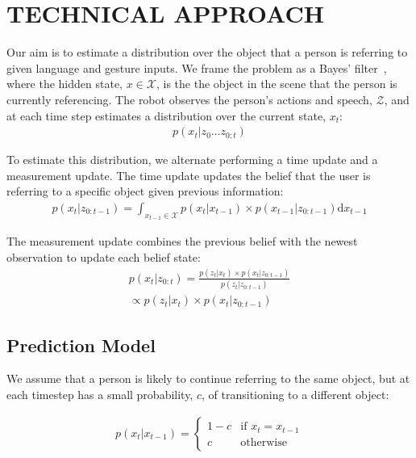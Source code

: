 \documentclass[letterpaper, 10 pt, conference]{ieeeconf}
\begin{document}
\section{TECHNICAL APPROACH}



Our aim is to estimate a distribution over the object that a person is
referring to given language and gesture inputs.  We frame the problem
as a Bayes' filter~\citep{thrun08}, where the hidden state,
$x \in \mathcal{X}$, is the the object in the scene that the person is
currently referencing. The robot observes the person's actions and
speech, $\mathcal{Z}$, and at each time step estimates a distribution
over the current state, $x_t$:
\begin{align}
  p(x_t | z_0 \dots z_{0:t})
\end{align}


To estimate this distribution, we alternate performing a time update
and a measurement update.  The time update updates the belief that the
user is referring to a specific object given previous
information:
\begin{align}
p(x_t | z_{0:t-1}) = \int_{x_{t-1} \in \mathcal{X}} p(x_t|x_{t-1})\times p(x_{t-1} | z_{0:t-1}) \text{d}x_{t-1}
\end{align}

The measurement update combines the previous belief with the newest observation to update each belief state: 
\begin{align}
p(x_t |z_{0:t}) = \frac{p(z_t | x_t) \times p(x_t | z_{0:t-1})}{p(z_t | z_{0:t-1})} \\\propto p(z_t | x_t) \times p(x_t | z_{0:t-1})
\end{align}



\subsection{Prediction Model}
We assume that a person is likely to continue referring to the same
object, but at each timestep has a small probability, $c$, of
transitioning to a different object: 

\begin{align}
p(x_t | x_{t-1}) = \left\{  \begin{array}{ll}
1-c &\mbox{if } x_t = x_{t-1}\\
c &\mbox{otherwise}
\end{array}\right.
\end{align}
\end{document}
